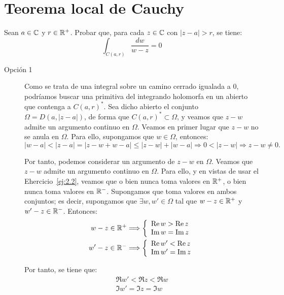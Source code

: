 \section{Teorema local de Cauchy}

\begin{ejercicio}
    Sean $a \in \mathbb{C}$ y $r \in \mathbb{R}^+$. Probar que, para cada $z \in \mathbb{C}$ con $|z-a| > r$, se tiene:
    \[
        \int_{C(a,r)} \frac{dw}{w-z} = 0
    \]
    \begin{description}
        \item[Opción 1] Como se trata de una integral sobre un camino cerrado igualada a $0$, podríamos buscar una primitiva del integrando holomorfa en un abierto que contenga a $C(a,r)^*$. Sea dicho abierto el conjunto $\Omega=D(a,|z-a|)$, de forma que $C(a,r)^* \subset \Omega$, y veamos que $z-w$ admite un argumento continuo en $\Omega$. Veamos en primer lugar que $z-w$ no se anula en $\Omega$. Para ello, supongamos que $w \in \Omega$, entonces:
        \begin{equation*}
            |w-a| < |z-a|=|z-w+w-a| \leq |z-w|+|w-a| \Longrightarrow 0<|z-w|\Longrightarrow z-w\neq 0.
        \end{equation*}

        Por tanto, podemos considerar un argumento de $z-w$ en $\Omega$. Veamos que $z-w$ admite un argumento continuo en $\Omega$. Para ello, y en vistas de usar el Ehercicio~\ref{ej:2.2}, veamos que o bien nunca toma valores en $\mathbb{R}^+$, o bien nunca toma valores en $\mathbb{R}^-$. Supongamos que toma valores en ambos conjuntos; es decir, supongamos que $\exists w,w'\in \Omega$ tal que $w-z\in \mathbb{R}^+$ y $w'-z\in \mathbb{R}^-$. Entonces:
        \begin{align*}
            w-z\in \mathbb{R}^+ & \Longrightarrow \left\{\begin{array}{l}
                \operatorname{Re} w > \operatorname{Re} z\\
                \operatorname{Im} w = \operatorname{Im} z
            \end{array}\right.\\
            w'-z\in \mathbb{R}^- & \Longrightarrow \left\{\begin{array}{l}
                \operatorname{Re} w' < \operatorname{Re} z\\
                \operatorname{Im} w' = \operatorname{Im} z
            \end{array}\right.
        \end{align*}

        Por tanto, se tiene que:
        \begin{align*}
            \Re w' < \Re z < \Re w\\
            \Im w' = \Im z = \Im w
        \end{align*}


\end{description}
\end{ejercicio}
